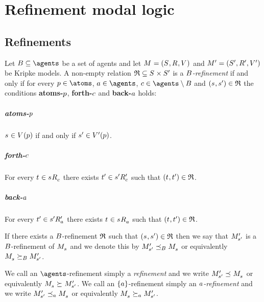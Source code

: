 \chapter{Refinement modal logic}\label{rml}

\section{Refinements}

\begin{definition}[Refinements]
Let $\agentsB \subseteq \agents$ be a set of agents and let $\kModelAndTuple$ and $\kModelAndTupleP$ be Kripke models.
A non-empty relation $\refinement \subseteq \kStates \times \kStatesP$ is a {\em $B$-refinement} if and only if for every $\atomP \in \atoms$, $\agentA \in \agents$, $\agentC \in \agents \setminus \agentsB$ and $(\kStateS, \kStateSP) \in \refinement$ the conditions {\bf atoms-$p$}, {\bf forth-$c$} and {\bf back-$a$} holds:

\paragraph{atoms-$p$}
$\kStateS \in \kValuation(\atomP)$ if and only if ${s}^{\prime} \in {V^{\prime}}(p)$.

\paragraph{forth-$c$}
For every $\kStateT \in \kSuccessorsC{\kStateS}$ there exists ${t}^{\prime} \in {{s}^{\prime}} {R^{\prime}_{c}}$ such that $(\kStateT, \kStateTP) \in \refinement$.

\paragraph{back-$a$}
For every ${t}^{\prime} \in {{s}^{\prime}} {R^{\prime}_{a}}$ there exists $\kStateT \in \kSuccessorsA{\kStateS}$ such that $(\kStateT, \kStateTP) \in \refinement$.

If there exists a $B$-refinement $\mathfrak{R}$ such that $(\kStateS, \kStateSP) \in \refinement$ then we say that ${M^{\prime}_{{s}^{\prime}}}$ is a $B$-refinement of $\kPModel{\kStateS}$ and we denote this by $\kPModelP{\kStateSP} \refinesBs \kPModel{\kStateS}$ or equivalently $\kPModel{\kStateS} \simulatesBs \kPModelP{\kStateSP}$.
\end{definition}

We call an $\agents$-refinement simply a {\em refinement} and we write $\kPModelP{\kStateSP} \refines \kPModel{\kStateS}$ or equivalently $\kPModel{\kStateS} \simulates \kPModelP{\kStateSP}$.
We call an $\{a\}$-refinement simply an {\em $a$-refinement} and we write $\kPModelP{\kStateSP} \refinesA \kPModel{\kStateS}$ or equivalently $\kPModel{\kStateS} \simulatesA \kPModelP{\kStateSP}$.

